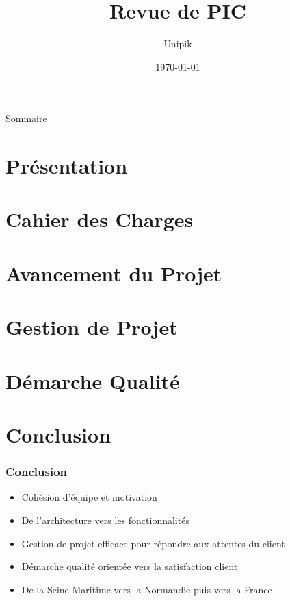 \documentclass[compress,xcolor=dvipsnames]{beamer}
\title{Revue de PIC}
\date{\today}
\author{Unipik}
\institute{\insa}
\begin{document}
\speaker{\Sergi} 

\begin{frame}[plain]
	\titlepage
\end{frame}

\begin{frame}{Sommaire}
	\tableofcontents[hideallsubsections]
\end{frame}
 

\speaker{\Sergi}
\section[Présentation]{Présentation}



\section[Cahier des charges]{Cahier des Charges}


\speaker{\Sergi}
\section[Avancement]{Avancement du Projet}


\speaker{\Sergi}
\section[Gestion projet]{Gestion de Projet}



\speaker{\Sergi}
\section[Qualité]{Démarche Qualité}


\speaker{\Sergi}
\section[Conclusion]{Conclusion}
\begin{frame}
\frametitle{Conclusion}
\begin{itemize}
 \item Cohésion d'équipe et motivation
 \item De l'architecture vers les fonctionnalités
 \item Gestion de projet efficace pour répondre aux attentes du client
 \item Démarche qualité orientée vers la satisfaction client
 \item De la Seine Maritime vers la Normandie puis vers la France
\end{itemize}
\end{frame}

 
\end{document}
